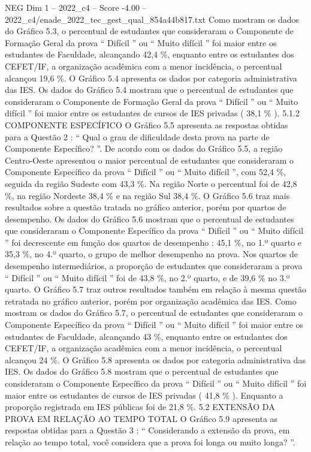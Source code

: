 \begin{textsample}{NEG Dim 1 – 2022\_c4 – Score -4.00 – 2022\_c4/enade\_2022\_tec\_gest\_qual\_854a44b817.txt}
Como mostram os dados do Gráfico 5.3, o percentual de estudantes que consideraram o Componente de Formação Geral da prova “ Difícil ” ou “ Muito difícil ” foi maior entre os estudantes de Faculdade, alcançando 42,4 \%, enquanto entre os estudantes dos CEFET/IF, a organização acadêmica com a menor incidência, o percentual alcançou 19,6 \%.
O Gráfico 5.4 apresenta os dados por categoria administrativa das IES.
Os dados do Gráfico 5.4 mostram que o percentual de estudantes que consideraram o Componente de Formação Geral da prova “ Difícil ” ou “ Muito difícil ” foi maior entre os estudantes de cursos de IES privadas ( 38,1 \% ). 5.1.2 COMPONENTE ESPECÍFICO O Gráfico 5.5 apresenta as respostas obtidas para a Questão 2 : “ Qual o grau de dificuldade desta prova na parte de Componente Específico? ”.
De acordo com os dados do Gráfico 5.5, a região Centro-Oeste apresentou o maior percentual de estudantes que consideraram o Componente Específico da prova “ Difícil ” ou “ Muito difícil ”, com 52,4 \%, seguida da região Sudeste com 43,3 \%.
Na região Norte o percentual foi de 42,8 \%, na região Nordeste 38,4 \% e na região Sul 38,4 \%.
O Gráfico 5.6 traz mais resultados sobre a questão tratada no gráfico anterior, porém por quartos de desempenho.
Os dados do Gráfico 5.6 mostram que o percentual de estudantes que consideraram o Componente Específico da prova “ Difícil ” ou “ Muito difícil ” foi decrescente em função dos quartos de desempenho : 45,1 \%, no 1.º quarto e 35,3 \%, no 4.º quarto, o grupo de melhor desempenho na prova.
Nos quartos de desempenho intermediários, a proporção de estudantes que consideraram a prova “ Difícil ” ou “ Muito difícil ” foi de 43,8 \%, no 2.º quarto, e de 39,6 \% no 3.º quarto.
O Gráfico 5.7 traz outros resultados também em relação à mesma questão retratada no gráfico anterior, porém por organização acadêmica das IES.
Como mostram os dados do Gráfico 5.7, o percentual de estudantes que consideraram o Componente Específico da prova “ Difícil ” ou “ Muito difícil ” foi maior entre os estudantes de Faculdade, alcançando 43 \%, enquanto entre os estudantes dos CEFET/IF, a organização acadêmica com a menor incidência, o percentual alcançou 24 \%.
O Gráfico 5.8 apresenta os dados por categoria administrativa das IES.
Os dados do Gráfico 5.8 mostram que o percentual de estudantes que consideraram o Componente Específico da prova “ Difícil ” ou “ Muito difícil ” foi maior entre os estudantes de cursos de IES privadas ( 41,8 \% ).
Enquanto a proporção registrada em IES públicas foi de 21,8 \%. 5.2 EXTENSÃO DA PROVA EM RELAÇÃO AO TEMPO TOTAL O Gráfico 5.9 apresenta as respostas obtidas para a Questão 3 : “ Considerando a extensão da prova, em relação ao tempo total, você considera que a prova foi longa ou muito longa? ”.

\end{textsample}
